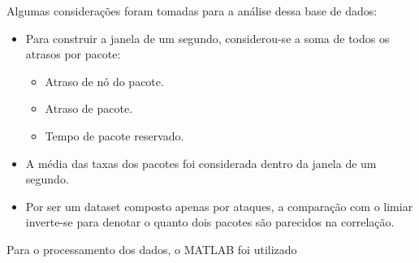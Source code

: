 Algumas considerações foram tomadas para a análise dessa base de dados:
\begin{itemize}
	\item Para construir a janela de um segundo, considerou-se a soma de todos os atrasos por pacote:
	\begin{itemize}
	 \item Atraso de nó do pacote.
	 \item  Atraso de pacote.
	 \item Tempo de pacote reservado.
	\end{itemize}
	\item A média das taxas dos pacotes foi considerada dentro da janela de um segundo.
	\item Por ser um dataset composto apenas por ataques, a comparação com o limiar inverte-se para denotar o quanto dois pacotes são parecidos na correlação.
\end{itemize}

Para o processamento dos dados, o MATLAB foi utilizado